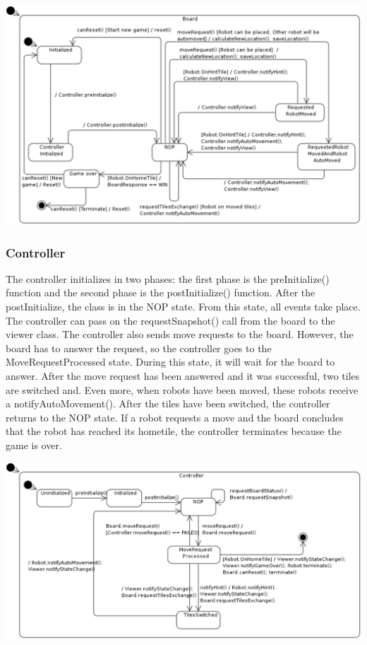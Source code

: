 	\includegraphics[width=\linewidth]{statecharts/board.pdf}

	\subsubsection{Controller}
	The controller initializes in two phases: the first phase is the preInitialize() function and the second phase is the postInitialize() function. After the postInitialize, the class is in the NOP state. From this state, all events take place. The controller can pass on the requestSnapshot() call from the board to the viewer class. The controller also sends move requests to the board. However, the board has to answer the request, so the controller goes to the MoveRequestProcessed state. During this state, it will wait for the board to answer. After the move request has been answered and it was successful, two tiles are switched and. Even more, when robots have been moved, these robots receive a notifyAutoMovement(). After the tiles have been switched, the controller returns to the NOP state. If a robot requests a move and the board concludes that the robot has reached its hometile, the controller terminates because the game is over.

	\includegraphics[width=\linewidth]{statecharts/controller.pdf}

